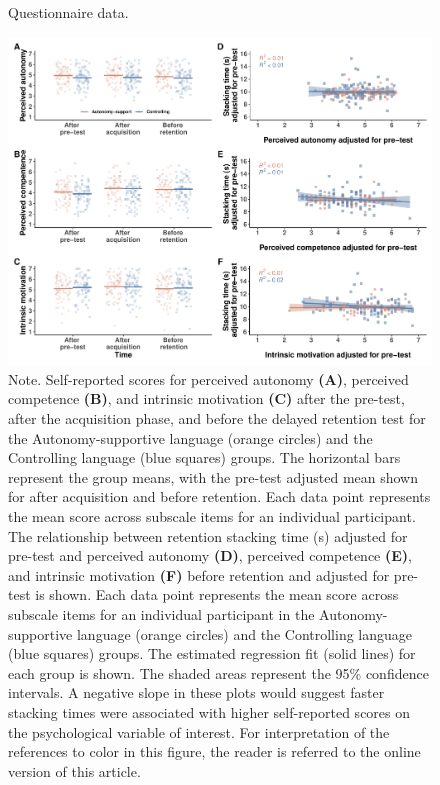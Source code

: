 \documentclass[man,floatsintext,donotrepeattitle,letterpaper,12pt]{apa7}
\begin{document}
\begin{figure}[htbp]
    \caption{Questionnaire data.}
    \centering
    \includegraphics[scale=0.55]{../../figs/fig3.pdf}
    \setlength{\belowcaptionskip}{-2em}
    \caption*{\singlespacing \small Note. \normalfont Self-reported scores for perceived autonomy \textbf{(A)}, perceived competence \textbf{(B)}, and intrinsic motivation \textbf{(C)} after the pre-test, after the acquisition phase, and before the delayed retention test for the Autonomy-supportive language (orange circles) and the Controlling language (blue squares) groups. The horizontal bars represent the group means, with the pre-test adjusted mean shown for after acquisition and before retention. Each data point represents the mean score across subscale items for an individual participant. The relationship between retention stacking time (s) adjusted for pre-test and perceived autonomy \textbf{(D)}, perceived competence \textbf{(E)}, and intrinsic motivation \textbf{(F)} before retention and adjusted for pre-test is shown. Each data point represents the mean score across subscale items for an individual participant in the Autonomy-supportive language (orange circles) and the Controlling language (blue squares) groups. The estimated regression fit (solid lines) for each group is shown. The shaded areas represent the 95\% confidence intervals. A negative slope in these plots would suggest faster stacking times were associated with higher self-reported scores on the psychological variable of interest. For interpretation of the references to color in this figure, the reader is referred to the online version of this article.}
    \label{fig:fig3}
\end{figure}
\end{document}

